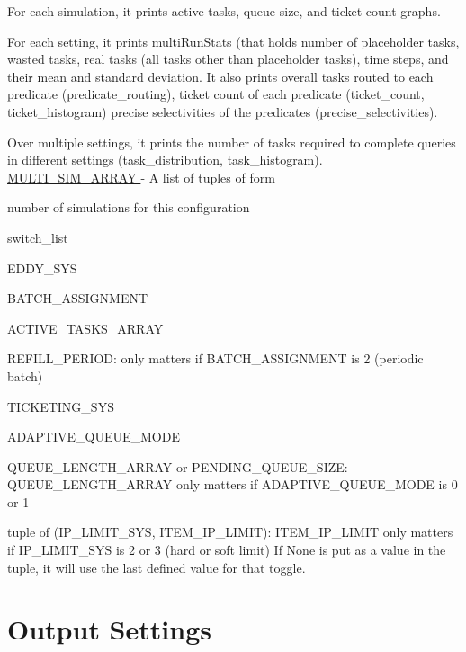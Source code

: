 \begin{DoxyItemize}
\item For each simulation, it prints active tasks, queue size, and ticket count graphs.
\item For each setting, it prints multi\+Run\+Stats (that holds number of placeholder tasks, wasted tasks, real tasks (all tasks other than placeholder tasks), time steps, and their mean and standard deviation. It also prints overall tasks routed to each predicate (predicate\+\_\+routing), ticket count of each predicate (ticket\+\_\+count, ticket\+\_\+histogram) precise selectivities of the predicates (precise\+\_\+selectivities).
\item Over multiple settings, it prints the number of tasks required to complete queries in different settings (task\+\_\+distribution, task\+\_\+histogram). ~\newline
 \hyperlink{namespacedynamicfilterapp_1_1toggles_a220d8cf87bacce3b4d63c494c95b918e}{M\+U\+L\+T\+I\+\_\+\+S\+I\+M\+\_\+\+A\+R\+R\+AY } -\/ A list of tuples of form
\item number of simulations for this configuration
\item switch\+\_\+list
\item E\+D\+D\+Y\+\_\+\+S\+YS
\item B\+A\+T\+C\+H\+\_\+\+A\+S\+S\+I\+G\+N\+M\+E\+NT
\item A\+C\+T\+I\+V\+E\+\_\+\+T\+A\+S\+K\+S\+\_\+\+A\+R\+R\+AY
\item R\+E\+F\+I\+L\+L\+\_\+\+P\+E\+R\+I\+OD\+: only matters if B\+A\+T\+C\+H\+\_\+\+A\+S\+S\+I\+G\+N\+M\+E\+NT is 2 (periodic batch)
\item T\+I\+C\+K\+E\+T\+I\+N\+G\+\_\+\+S\+YS
\item A\+D\+A\+P\+T\+I\+V\+E\+\_\+\+Q\+U\+E\+U\+E\+\_\+\+M\+O\+DE
\item Q\+U\+E\+U\+E\+\_\+\+L\+E\+N\+G\+T\+H\+\_\+\+A\+R\+R\+AY or P\+E\+N\+D\+I\+N\+G\+\_\+\+Q\+U\+E\+U\+E\+\_\+\+S\+I\+ZE\+: Q\+U\+E\+U\+E\+\_\+\+L\+E\+N\+G\+T\+H\+\_\+\+A\+R\+R\+AY only matters if A\+D\+A\+P\+T\+I\+V\+E\+\_\+\+Q\+U\+E\+U\+E\+\_\+\+M\+O\+DE is 0 or 1
\item tuple of (I\+P\+\_\+\+L\+I\+M\+I\+T\+\_\+\+S\+YS, I\+T\+E\+M\+\_\+\+I\+P\+\_\+\+L\+I\+M\+IT)\+: I\+T\+E\+M\+\_\+\+I\+P\+\_\+\+L\+I\+M\+IT only matters if I\+P\+\_\+\+L\+I\+M\+I\+T\+\_\+\+S\+YS is 2 or 3 (hard or soft limit) If None is put as a value in the tuple, it will use the last defined value for that toggle.
\end{DoxyItemize}\hypertarget{toggles_output}{}\section{Output Settings}\label{toggles_output}
